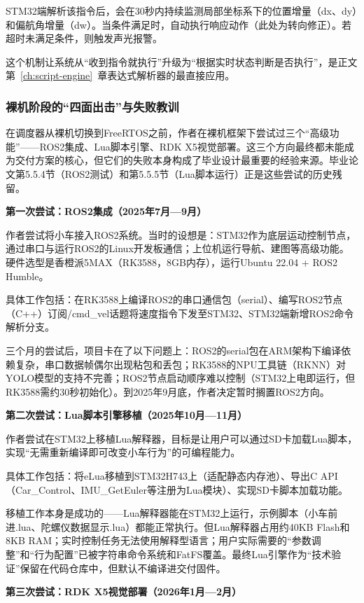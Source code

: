 STM32端解析该指令后，会在30秒内持续监测局部坐标系下的位置增量（dx、dy）和偏航角增量（dw）。当条件满足时，自动执行响应动作（此处为转向修正）。若超时未满足条件，则触发声光报警。

这个机制让系统从“收到指令就执行”升级为“根据实时状态判断是否执行”，是正文第~\ref{ch:script-engine}~章表达式解析器的最直接应用。

\subsubsection{裸机阶段的“四面出击”与失败教训}

在调度器从裸机切换到FreeRTOS之前，作者在裸机框架下尝试过三个“高级功能”——ROS2集成、Lua脚本引擎、RDK X5视觉部署。这三个方向最终都未能成为交付方案的核心，但它们的失败本身构成了毕业设计最重要的经验来源。毕业论文第5.5.4节（ROS2测试）和第5.5.5节（Lua脚本运行）正是这些尝试的历史残留。

\textbf{第一次尝试：ROS2集成（2025年7月—9月）}

作者尝试将小车接入ROS2系统。当时的设想是：STM32作为底层运动控制节点，通过串口与运行ROS2的Linux开发板通信；上位机运行导航、建图等高级功能。硬件选型是香橙派5MAX（RK3588，8GB内存），运行Ubuntu 22.04 + ROS2 Humble。

具体工作包括：在RK3588上编译ROS2的串口通信包（serial）、编写ROS2节点（C++）订阅/cmd\_vel话题将速度指令下发至STM32、STM32端新增ROS2命令解析分支。

三个月的尝试后，项目卡在了以下问题上：ROS2的serial包在ARM架构下编译依赖复杂，串口数据帧偶尔出现粘包和丢包；RK3588的NPU工具链（RKNN）对YOLO模型的支持不完善；ROS2节点启动顺序难以控制（STM32上电即运行，但RK3588需约30秒初始化）。到2025年9月底，作者决定暂时搁置ROS2方向。

\textbf{第二次尝试：Lua脚本引擎移植（2025年10月—11月）}

作者尝试在STM32上移植Lua解释器，目标是让用户可以通过SD卡加载Lua脚本，实现“无需重新编译即可改变小车行为”的可编程能力。

具体工作包括：将eLua移植到STM32H743上（适配静态内存池）、导出C API（Car\_Control、IMU\_GetEuler等注册为Lua模块）、实现SD卡脚本加载功能。

移植工作本身是成功的——Lua解释器能在STM32上运行，示例脚本（小车前进.lua、陀螺仪数据显示.lua）都能正常执行。但Lua解释器占用约40KB Flash和8KB RAM；实时控制任务无法使用解释型语言；用户实际需要的“参数调整”和“行为配置”已被字符串命令系统和FatFS覆盖。最终Lua引擎作为“技术验证”保留在代码仓库中，但默认不编译进交付固件。

\textbf{第三次尝试：RDK X5视觉部署（2026年1月—2月）}

